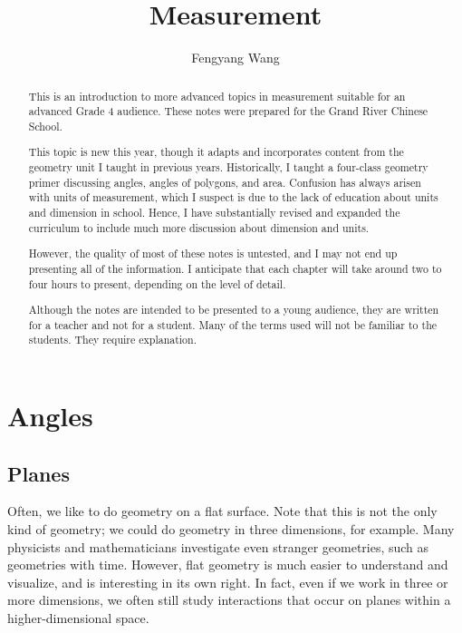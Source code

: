 \documentclass[a4paper,10pt]{report}
\title{Measurement}
\author{Fengyang Wang}
\begin{document}
\begin{abstract}
 This is an introduction to more advanced topics in measurement suitable for an
 advanced Grade 4 audience. These notes were prepared for the Grand River
 Chinese School.

 This topic is new this year, though it adapts and incorporates content from the
 geometry unit I taught in previous years. Historically, I taught a four-class
 geometry primer discussing angles, angles of polygons, and area. Confusion has
 always arisen with units of measurement, which I suspect is due to the lack of
 education about units and dimension in school. Hence, I have substantially
 revised and expanded the curriculum to include much more discussion about
 dimension and units.

 However, the quality of most of these notes is untested, and I may not end up
 presenting all of the information. I anticipate that each chapter will take
 around two to four hours to present, depending on the level of detail.

 Although the notes are intended to be presented to a young audience, they are
 written for a teacher and not for a student. Many of the terms used will not be
 familiar to the students. They require explanation.
\end{abstract}

\maketitle

\tableofcontents

\chapter{Angles}

\section{Planes}

Often, we like to do geometry on a flat surface. Note that this is not the only
kind of geometry; we could do geometry in three dimensions, for example. Many
physicists and mathematicians investigate even stranger geometries, such as
geometries with time. However, flat geometry is much easier to understand and
visualize, and is interesting in its own right. In fact, even if we work in
three or more dimensions, we often still study interactions that occur on planes
within a higher-dimensional space.
\end{document}

